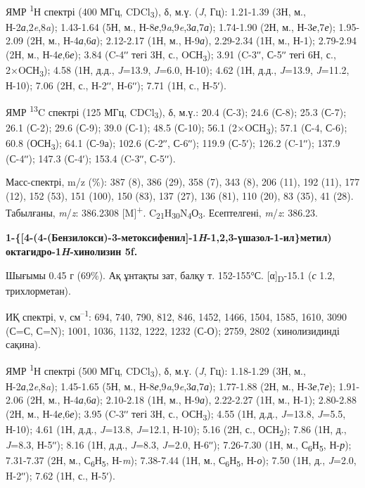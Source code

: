 ЯМР \textsuperscript{1}Н спектрі (400 МГц, CDCl\textsubscript{3}), δ,
м.ү. (\emph{J}, Гц): 1.21-1.39 (3Н, м.,
Н-2\emph{а},2\emph{e},8\emph{a}); 1.43-1.64 (5Н, м.,
Н-8\emph{е},9\emph{a},9\emph{e},3\emph{а},7\emph{а}); 1.74-1.90 (2Н, м.,
Н-3\emph{е},7\emph{е}); 1.95-2.09 (2Н, м., Н-4\emph{а},6\emph{а});
2.12-2.17 (1Н, м., Н-9\emph{а}), 2.29-2.34 (1H, м., Н-1); 2.79-2.94 (2Н,
м., Н-4\emph{е},6\emph{е}); 3.84 (C-4ʹʹ тегі 3Н, с.,
OСН\textsubscript{3}); 3.91 (C-3ʹʹ, С-5ʹʹ тегі 6Н, с.,
2×OСН\textsubscript{3}); 4.58 (1Н, д.д., \emph{J}=13.9, \emph{J}=6.0,
Н-10); 4.62 (1Н, д.д., \emph{J}=13.9, \emph{J}=11.2, Н-10); 7.06 (2Н,
с., Н-2ʹʹ, Н-6ʹʹ); 7.71 (1Н, с., Н-5ʹ). \hl{}

ЯМР \textsuperscript{13}C спектрі (125 МГц, CDCl\textsubscript{3}), δ,
м.ү.: 20.4 (С-3); 24.6 (С-8); 25.3 (С-7); 26.1 (С-2); 29.6 (С-9); 39.0
(С-1); 48.5 (С-10); 56.1 (2×OСH\textsubscript{3}); 57.1 (С-4, С-6); 60.8
(ОСН\textsubscript{3}); 64.1 (С-9а); 102.6 (С-2ʹʹ, С-6ʹʹ); 119.9 (С-5ʹ);
126.2 (C-1ʹʹ); 137.9 (С-4ʹʹ); 147.3 (С-4ʹ); 153.4 (C-3ʹʹ, С-5ʹʹ).

Масс-спектрі, m/z (\%): 387 (8), 386 (29), 358 (7), 343 (8), 206 (11),
192 (11), 177 (12), 152 (53), 151 (100), 150 (83), 137 (27), 136 (81),
110 (20), 83 (35), 41 (28). Табылғаны, \emph{m}/\emph{z}: 386.2308
{[}M{]}\textsuperscript{+}.
C\textsubscript{21}H\textsubscript{30}N\textsubscript{4}О\textsubscript{3}.
Есептелгені, \emph{m}/\emph{z}: 386.23.

\textbf{1-\{{[}4-(4-(Бензилокси)-3-метоксифенил{]}-1\emph{H}-1,2,3-үшазол-1-ил\}метил)
октагидро-1\emph{H}-хинолизин 5f.}

Шығымы 0.45 г (69\%). Ақ ұнтақты зат, балқу т. 152-155°С.
{[}α{]}\textsubscript{D}-15.1 (\emph{с} 1.2, трихлорметан). \hl{}

ИҚ спектрі, ν, см\textsuperscript{--1}: 694, 740, 790, 812, 846, 1452,
1466, 1504, 1585, 1610, 3090 (С=С, С=N); 1001, 1036, 1132, 1222, 1232
(С-О); 2759, 2802 (хинолизидинді сақина).

ЯМР \textsuperscript{1}Н спектрі (500 МГц, CDCl\textsubscript{3}), δ,
м.ү. (\emph{J}, Гц): 1.18-1.29 (3Н, м.,
Н-2\emph{а},2\emph{e},8\emph{a}); 1.45-1.65 (5Н, м.,
Н-8\emph{е},9\emph{a},9\emph{e},3\emph{а},7\emph{а}); 1.77-1.88 (2Н, м.,
Н-3\emph{е},7\emph{е}); 1.91-2.06 (2Н, м., Н-4\emph{а},6\emph{а});
2.10-2.18 (1Н, м., Н-9\emph{а}), 2.22-2.27 (1H, м., Н-1); 2.80-2.88 (2Н,
м., Н-4\emph{е},6\emph{е}); 3.95 (C-3ʹʹ тегі 3Н, с.,
OСН\textsubscript{3}); 4.55 (1Н, д.д., \emph{J}=13.8, \emph{J}=5.5,
Н-10); 4.61 (1Н, д.д., \emph{J}=13.8, \emph{J}=12.1, Н-10); 5.16 (2Н,
с., ОСН\textsubscript{2}); 7.86 (1Н, д., \emph{J}=8.3, Н-5ʹʹ); 8.16 (1Н,
д.д., \emph{J}=8.3, \emph{J}=2.0, Н-6ʹʹ); 7.26-7.30 (1Н, м.,
С\textsubscript{6}Н\textsubscript{5}, Н-\emph{р}); 7.31-7.37 (2Н, м.,
С\textsubscript{6}Н\textsubscript{5}, Н-\emph{m}); 7.38-7.44 (1Н, м.,
С\textsubscript{6}Н\textsubscript{5}, Н-\emph{о}); 7.50 (1Н, д.,
\emph{J}=2.0, H-2ʹʹ); 7.62 (1Н, с., Н-5ʹ).

